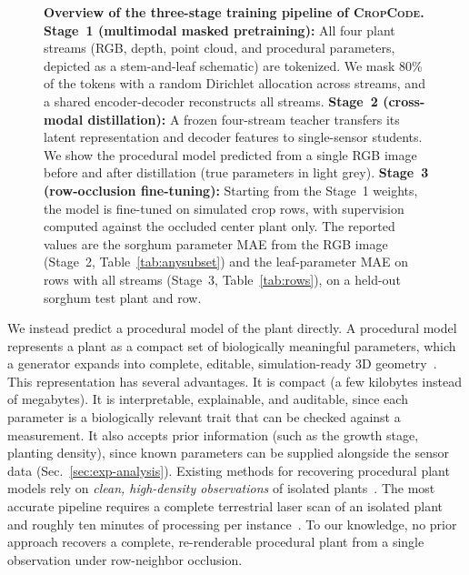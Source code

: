 \documentclass[10pt,twocolumn,letterpaper]{article}
\newcommand{\method}{\textsc{CropCode}}
\begin{document}
\begin{figure}[t]
  \centering
  \resizebox{\linewidth}{!}{}
  \caption{\textbf{Overview of the three-stage training pipeline of \method{}.} \textbf{Stage~1 (multimodal masked pretraining):} All four plant streams (RGB, depth, point cloud, and procedural parameters, depicted as a stem-and-leaf schematic) are tokenized. We mask 80\% of the tokens with a random Dirichlet allocation across streams, and a shared encoder-decoder reconstructs all streams. \textbf{Stage~2 (cross-modal distillation):} A frozen four-stream teacher transfers its latent representation and decoder features to single-sensor students. We show the procedural model predicted from a single RGB image before and after distillation (true parameters in light grey). \textbf{Stage~3 (row-occlusion fine-tuning):} Starting from the Stage~1 weights, the model is fine-tuned on simulated crop rows, with supervision computed against the occluded center plant only. The reported values are the sorghum parameter MAE from the RGB image (Stage~2, Table~\ref{tab:anysubset}) and the leaf-parameter MAE on rows with all streams (Stage~3, Table~\ref{tab:rows}), on a held-out sorghum test plant and row.}
  \label{fig:arch}
\end{figure}

We instead predict a procedural model of the plant directly. A procedural model represents a plant as a compact set of biologically meaningful parameters, which a generator expands into complete, editable, simulation-ready 3D geometry~\citep{prusin1990abop, floraforge2026}. This representation has several advantages. It is compact (a few kilobytes instead of megabytes). It is interpretable, explainable, and auditable, since each parameter is a biologically relevant trait that can be checked against a measurement. It also accepts prior information (such as the growth stage, planting density), since known parameters can be supplied alongside the sensor data (Sec.~\ref{sec:exp-analysis}). Existing methods for recovering procedural plant models rely on \textit{clean, high-density observations }of isolated plants~\citep{cropcraft2026,demeter2025, ghrer2025paramplants}. The most accurate pipeline requires a complete terrestrial laser scan of an isolated plant and roughly ten minutes of processing per instance~\citep{hadadi2026vlmmaize}. To our knowledge, no prior approach recovers a complete, re-renderable procedural plant from a single observation under row-neighbor occlusion.
\end{document}
